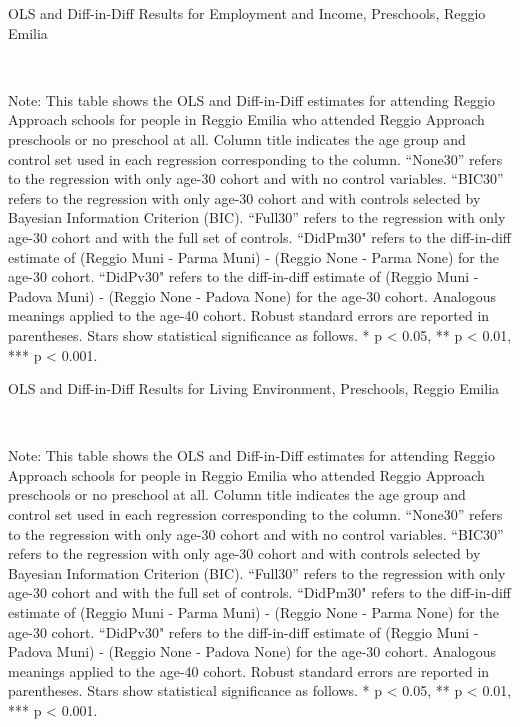 \begin{landscape}
\begin{table}[H] \caption{OLS and Diff-in-Diff Results for Employment and Income, Preschools, Reggio Emilia} \label{ols-W-reg}
\scalebox{0.85}{
}
\vspace{1ex} \\
\footnotesize\raggedright{Note: This table shows the OLS and Diff-in-Diff estimates for attending Reggio Approach schools for people in Reggio Emilia who attended Reggio Approach preschools or no preschool at all. Column title indicates the age group and control set used in each regression corresponding to the column. ``None30'' refers to the regression with only age-30 cohort and with no control variables. ``BIC30'' refers to the regression with only age-30 cohort and with controls selected by Bayesian Information Criterion (BIC). ``Full30'' refers to the regression with only age-30 cohort and with the full set of controls. ``DidPm30" refers to the diff-in-diff estimate of (Reggio Muni - Parma Muni) - (Reggio None - Parma None) for the age-30 cohort. ``DidPv30" refers to the diff-in-diff estimate of (Reggio Muni - Padova Muni) - (Reggio None - Padova None) for the age-30 cohort. Analogous meanings applied to the age-40 cohort. Robust standard errors are reported in parentheses. Stars show statistical significance as follows. * p < 0.05, ** p < 0.01, *** p < 0.001.}
\end{table}


\begin{table}[H] \caption{OLS and Diff-in-Diff Results for Living Environment, Preschools, Reggio Emilia} \label{ols-L-reg}
\scalebox{0.85}{
}
\vspace{1ex} \\
\footnotesize\raggedright{Note: This table shows the OLS and Diff-in-Diff estimates for attending Reggio Approach schools for people in Reggio Emilia who attended Reggio Approach preschools or no preschool at all. Column title indicates the age group and control set used in each regression corresponding to the column. ``None30'' refers to the regression with only age-30 cohort and with no control variables. ``BIC30'' refers to the regression with only age-30 cohort and with controls selected by Bayesian Information Criterion (BIC). ``Full30'' refers to the regression with only age-30 cohort and with the full set of controls. ``DidPm30" refers to the diff-in-diff estimate of (Reggio Muni - Parma Muni) - (Reggio None - Parma None) for the age-30 cohort. ``DidPv30" refers to the diff-in-diff estimate of (Reggio Muni - Padova Muni) - (Reggio None - Padova None) for the age-30 cohort. Analogous meanings applied to the age-40 cohort. Robust standard errors are reported in parentheses. Stars show statistical significance as follows. * p < 0.05, ** p < 0.01, *** p < 0.001.}
\end{table}


\end{landscape}
